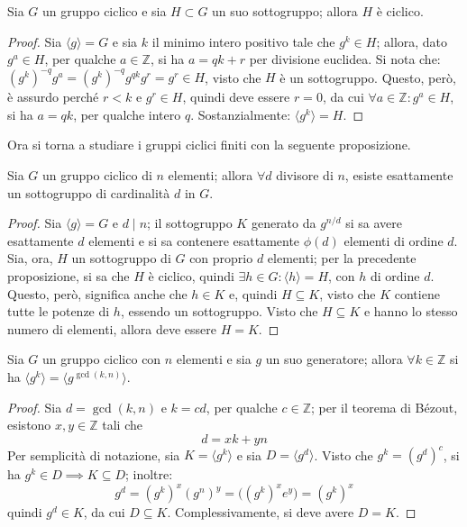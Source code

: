 \documentclass[11pt, a4paper]{scrartcl}
\theoremstyle{definition}
\numberwithin{esempio}{section}
\theoremstyle{definition}
\numberwithin{obs}{section}
\numberwithin{nota}{section}
\numberwithin{equation}{subsection}
\begin{document}
\begin{prop}
	{}{}
	Sia $G$ un gruppo ciclico e sia $H \subset G$ un suo sottogruppo; allora $H$ \`e ciclico.
	\begin{proof}
		Sia $\langle g \rangle= G$ e sia $k$ il minimo intero positivo tale che $g^k \in H$; allora, dato $g^a \in H$, per qualche $a \in \mathbb{Z}$, si ha $a = qk + r$ per divisione euclidea.
Si nota che: $(g^k)^{-q} g^a = (g^k)^{-q} g^{qk} g^r=g^r \in H$, visto che $H$ \`e un sottogruppo.
Questo, per\`o, \`e assurdo perch\'e $r < k$ e $g^r \in H$, quindi deve essere $r = 0$, da cui $\forall a \in \mathbb{Z} : g^a\in H$, si ha $a = qk$, per qualche intero $q$.
Sostanzialmente: $\langle g^k \rangle = H$.
	\end{proof}
\end{prop}
Ora si torna a studiare i gruppi ciclici finiti con la seguente proposizione.
\begin{prop}
	{}{}
	Sia $G$ un gruppo ciclico di $n$ elementi; allora $\forall d$ divisore di $n$, esiste esattamente un sottogruppo di cardinalit\`a $d$ in $G$.
	\begin{proof}
		Sia $\langle g \rangle= G$ e $d \mid n$; il sottogruppo $K$ generato da $g^{n / d} $ si sa avere esattamente $d$ elementi e si sa contenere esattamente $\phi (d)$ elementi di ordine $d$.
		Sia, ora, $H $ un sottogruppo di $G$ con proprio $d$ elementi; per la precedente proposizione, si sa che $H$ \`e ciclico, quindi $\exists h \in G : \langle h \rangle=H$, con $h$ di ordine $d$.
		Questo, per\`o, significa anche che $h \in K$ e, quindi $H \subseteq K$, visto che $K$ contiene tutte le potenze di $h$, essendo un sottogruppo.
		Visto che $H \subseteq K$ e hanno lo stesso numero di elementi, allora deve essere $H = K$.
	\end{proof}
\end{prop}
\begin{prop}
	{}{}
	Sia $G$ un gruppo ciclico con $n $ elementi e sia $g$ un suo generatore; allora $\forall k \in \mathbb{Z}$ si ha $\langle g^k \rangle= \langle g^{\operatorname{gcd}(k,n) }  \rangle$.
	\begin{proof}
		Sia $d = \operatorname{gcd}(k,n) $ e $k = cd$, per qualche $c \in \mathbb{Z}$; per il teorema di B\'ezout, esistono $x,y \in \mathbb{Z}$ tali che
		\[
		d = xk + yn
		\] 
		Per semplicit\`a di notazione, sia $K = \langle g^k \rangle$ e sia $D = \langle g^d \rangle$.
		Visto che $g^k=(g^d)^c$, si ha $g^k \in D\implies K \subseteq D$; inoltre:
		\[
		g^d = (g^k)^x (g^n)^y = \big((g^k)^xe^y\big)=(g^k)^x
		\] 
		quindi $g^d \in K$, da cui $D \subseteq K$.
		Complessivamente, si deve avere $D = K$.
	\end{proof}
\end{prop}
\end{document}
